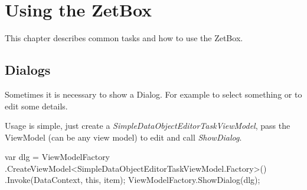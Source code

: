 \chapter{Using the ZetBox}

This chapter describes common tasks and how to use the ZetBox.

\section{Dialogs}
Sometimes it is necessary to show a Dialog. For example to select something or
to edit some details.
\par

Usage is simple, just create a \emph{SimpleDataObjectEditorTaskViewModel}, pass the ViewModel (can be any view model) to edit and call \emph{ShowDialog}.
\begin{CS}
var dlg = ViewModelFactory
	.CreateViewModel<SimpleDataObjectEditorTaskViewModel.Factory>()
	.Invoke(DataContext, this, item); 
ViewModelFactory.ShowDialog(dlg);
\end{CS}

